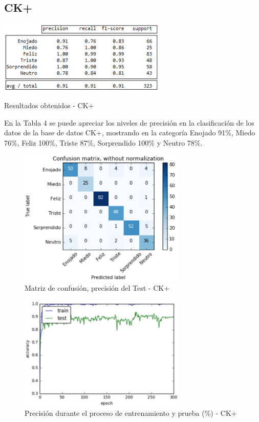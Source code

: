 \subsection{CK+}

\begin{table}[H]
    \centering
    \includegraphics[width=80mm]{Imagenes/tabla_resultados_ck+.png} 
    \caption{Resultados obtenidos - CK+}
    \label{tab:tabla_resultados_ck+}
\end{table}

En la Tabla 4 se puede apreciar los niveles de precisión en la clasificación de los
datos de la base de datos CK+, mostrando en la categoría Enojado 91\%, Miedo 76\%,
Feliz 100\%, Triste 87\%, Sorprendido 100\% y Neutro 78\%.

\begin{figure}[H]
		\centering
		\includegraphics[width=80mm]{Imagenes/matriz_confusion_ck+.png}
		\caption{Matriz de confusión, precisión del Test - CK+}
		\label{fig:matriz_confusion_ck+}
\end{figure}

\begin{figure}[H]
		\centering
		\includegraphics[width=80mm]{Imagenes/precision_ck+.png}
		\caption{Precisión durante el proceso de entrenamiento y prueba (\%) - CK+}
		\label{fig:precision-ck+}
\end{figure}

